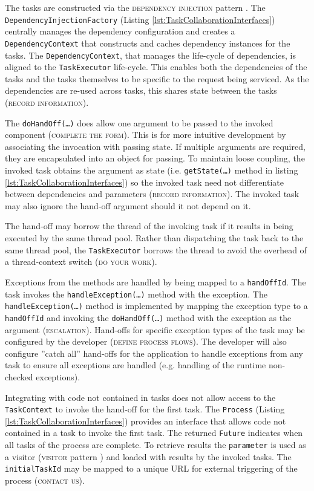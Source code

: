 \documentclass[prodmode]{style/acmlarge}
\begin{document}
The tasks are constructed via the \textsc{dependency injection} pattern
\cite{ioc}.  The \texttt{Dependency\-InjectionFactory} (Listing
\ref{lst:TaskCollaborationInterfaces}) centrally manages the dependency
configuration and creates a \texttt{Depend\-ency\-Context} that constructs and
caches dependency instances for the tasks.  The \texttt{Dependency\-Context},
that manages the life-cycle of dependencies, is aligned to the
\texttt{TaskExecutor} life-cycle.  This enables both the dependencies of the
tasks and the tasks themselves to be specific to the request being serviced.
As the dependencies are re-used across tasks, this shares state between the
tasks (\textsc{record information}).

The \texttt{doHandOff(\ldots)} does allow one argument to be passed to the
invoked component (\textsc{complete the form}).  This is for more intuitive
development by associating the invocation with passing state.  If multiple
arguments are required, they are encapsulated into an object for passing.
To maintain loose coupling, the invoked task obtains the argument as state (i.e.
\texttt{getState(\ldots)} method in listing
\ref{lst:TaskCollaborationInterfaces}) so the invoked task need not
differentiate between dependencies and parameters (\textsc{record information}).
The invoked task may also ignore the hand-off argument should it not depend on
it.

The hand-off may borrow the thread of the invoking task if it results in being
executed by the same thread pool.  Rather than dispatching the task back to the
same thread pool, the \texttt{TaskExecutor} borrows the thread to avoid the
overhead of a thread-context switch (\textsc{do your work}).

Exceptions from the methods are handled by being mapped to a \texttt{handOffId}.
 The task invokes the \texttt{handle\-Excep\-tion(\ldots)} method with the
exception.  The \texttt{handleException(\ldots)} method is implemented by
mapping the exception type to a \texttt{handOffId} and invoking the
\texttt{doHandOff(\ldots)} method with the exception as the argument
(\textsc{escalation}).  Hand-offs for specific exception types of the task may
be configured by the developer (\textsc{define process flows}).  The developer
will also configure ''catch all'' hand-offs for the application to handle
exceptions from any task to ensure all exceptions are handled (e.g. handling of
the runtime non-checked exceptions).

Integrating with code not contained in tasks does not allow access to the
\texttt{TaskContext} to invoke the hand-off for the first task.  The
\texttt{Process} (Listing \ref{lst:TaskCollaborationInterfaces}) provides an
interface that allows code not contained in a task to invoke the first task.
The returned \texttt{Future} indicates when all tasks of the process are
complete.  To retrieve results the \texttt{parameter} is used as a visitor
(\textsc{visitor} pattern \cite{gof}) and loaded with results by the invoked
tasks.  The \texttt{initialTaskId} may be mapped to a unique URL for external
triggering of the process (\textsc{contact us}).
\end{document}
